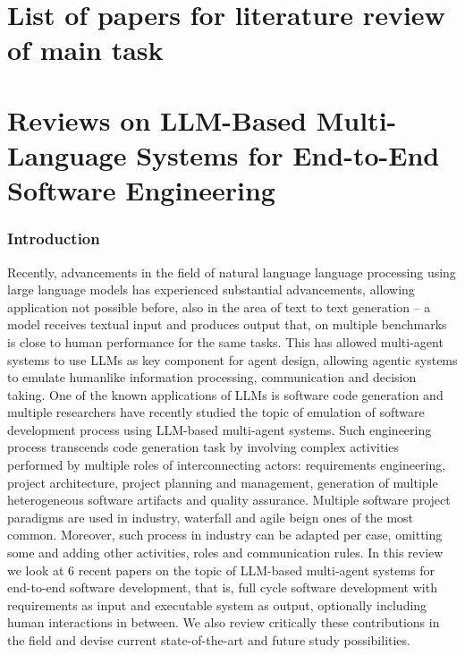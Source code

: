 \setcounter{page}{1}

\section{List of papers for literature review of main task}



\section{Reviews on LLM-Based Multi-Language Systems for End-to-End Software Engineering}

\subsubsection{Introduction}
\label{mas:intro}

Recently, advancements in the field of natural language language processing using large language models has experienced substantial advancements, allowing application not possible before, also in the area of text to text generation -- a model receives textual input and produces output that, on multiple benchmarks is close to human performance for the same tasks. This has allowed multi-agent systems to use LLMs as key component for agent design, allowing agentic systems to emulate humanlike information processing, communication and decision taking. One of the known applications of LLMs is software code generation and multiple researchers have recently studied the topic of emulation of software development process using LLM-based multi-agent systems. Such engineering process transcends code generation task by involving complex activities performed by multiple roles of interconnecting actors: requirements engineering, project architecture, project planning and management, generation of multiple heterogeneous software artifacts and quality assurance. Multiple software project paradigms are used in industry, waterfall and agile beign ones of the most common. Moreover, such process in industry can be adapted per case, omitting some and adding other activities, roles and communication rules. In this review we look at 6 recent papers on the topic of LLM-based multi-agent systems for end-to-end software development, that is, full cycle software development with requirements as input and executable system as output, optionally including human interactions in between. We also review critically these contributions in the field and devise current state-of-the-art and future study possibilities.

